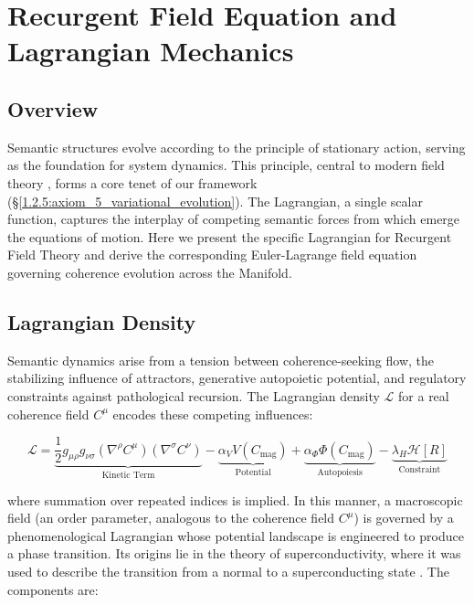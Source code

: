 \chapter{Recurgent Field Equation and Lagrangian Mechanics}
\label{6:recurgent_field_equation_and_lagrangian_mechanics}


\section{Overview}
\label{6.1:overview}

Semantic structures evolve according to the principle of stationary action, serving as the foundation for system dynamics. This principle, central to modern field theory \autocite{GoldsteinPooleSafko2002, Arnold1989}, forms a core tenet of our framework (\S\ref{1.2.5:axiom_5_variational_evolution}). The Lagrangian, a single scalar function, captures the interplay of competing semantic forces from which emerge the equations of motion. Here we present the specific Lagrangian for Recurgent Field Theory and derive the corresponding Euler-Lagrange field equation governing coherence evolution across the Manifold.


\section{Lagrangian Density}
\label{6.2:lagrangian_density}

Semantic dynamics arise from a tension between coherence-seeking flow, the stabilizing influence of attractors, generative autopoietic potential, and regulatory constraints against pathological recursion. The Lagrangian density \(\mathcal{L}\) for a real coherence field \(C^\mu\) encodes these competing influences:

\begin{equation}
\mathcal{L} = \underbrace{\frac{1}{2} g_{\mu\rho} g_{\nu\sigma} (\nabla^\rho C^\mu)(\nabla^\sigma C^\nu)}_{\text{Kinetic Term}} - \underbrace{\alpha_V V(C_{\text{mag}})}_{\text{Potential}} + \underbrace{\alpha_\Phi \Phi(C_{\text{mag}})}_{\text{Autopoiesis}} - \underbrace{\lambda_H \mathcal{H}[R]}_{\text{Constraint}}
\end{equation}

where summation over repeated indices is implied. In this manner, a macroscopic field (an order parameter, analogous to the coherence field \(C^\mu\)) is governed by a phenomenological Lagrangian whose potential landscape is engineered to produce a phase transition. Its origins lie in the theory of superconductivity, where it was used to describe the transition from a normal to a superconducting state \autocite{GinzburgLandau1950}. The components are:

